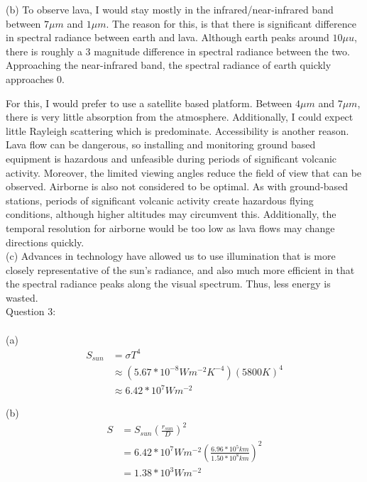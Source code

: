 \documentclass{homework}
\begin{document}
(b)
To observe lava, I would stay mostly in the infrared/near-infrared band between $7 \mu m$ and $1 \mu m$. The reason for this, is that there is significant difference in spectral radiance between earth and lava. Although earth peaks around $10 \mu u$, there is roughly a 3 magnitude difference in spectral radiance between the two. Approaching the near-infrared band, the spectral radiance of earth quickly approaches 0. 

For this, I would prefer to use a satellite based platform. Between $4 \mu m$ and $7 \mu m$, there is very little absorption from the atmosphere. Additionally, I could expect little Rayleigh scattering which is predominate. Accessibility is another reason. Lava flow can be dangerous, so installing and monitoring ground based equipment is hazardous and unfeasible during periods of significant volcanic activity. Moreover, the limited viewing angles reduce the field of view that can be observed. Airborne is also not considered to be optimal. As with ground-based stations, periods of significant volcanic activity create hazardous flying conditions, although higher altitudes may circumvent this. Additionally, the temporal resolution for airborne would be too low as lava flows may change directions quickly. \\

(c)
Advances in technology have allowed us to use illumination that is more closely representative of the sun's radiance, and also much more efficient in that the spectral radiance peaks along the visual spectrum. Thus, less energy is wasted. \\


Question 3: \\ \\
(a) 
\begin{equation*}
    \begin{split}
        S_{sun} 
        & = \sigma T^4 \\
        & \approx (5.67*10^{-8}Wm^{-2}K^{-4})(5800K)^4 \\
        & \approx 6.42*10^{7}Wm^{-2}
    \end{split}
\end{equation*}
    
    
(b)
\begin{equation*}
    \begin{split}
        S 
        & = S_{sun}(\frac{r_{sun}}{D})^2 \\
        & = 6.42*10^7 Wm^{-2}(\frac{6.96*10^5 km}{1.50*10^8 km})^2 \\
        & = 1.38*10^3 Wm^{-2}
    \end{split}
\end{equation*}
    
\end{document}

